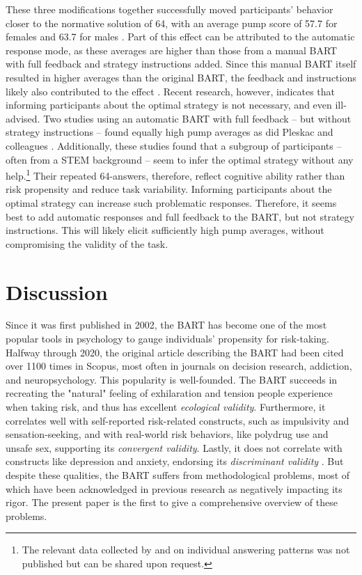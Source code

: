 \documentclass[serif, twocolumn, authordate, meta]{jote-article}
\begin{document}
These three modifications together successfully moved participants' behavior closer to the normative solution of 64, with an average pump score of 57.7 for females and 63.7 for males \parencite{Pleskac2008}. Part of this effect can be attributed to the automatic response mode, as these averages are higher than those from a manual BART with full feedback and strategy instructions added. Since this manual BART itself resulted in higher averages than the original BART, the feedback and instructions likely also contributed to the effect \parencite{Lejuez2002}. Recent research, however, indicates that informing participants about the optimal strategy is not necessary, and even ill-advised. Two studies using an automatic BART with full feedback -- but without strategy instructions -- found equally high pump averages as did Pleskac and colleagues \parencite{Bernoster2019,deGroot2019}. Additionally, these studies found that a subgroup of participants -- often from a STEM background -- seem to infer the optimal strategy without any help.\footnote[2]{The relevant data collected by \cite{Bernoster2019} and \cite{deGroot2019} on individual answering patterns was not published but can be shared upon request.} Their repeated 64-answers, therefore, reflect cognitive ability rather than risk propensity and reduce task variability. Informing participants about the optimal strategy can increase such problematic responses. Therefore, it seems best to add automatic responses and full feedback to the BART, but not strategy instructions. This will likely elicit sufficiently high pump averages, without compromising the validity of the task.

{}
\section*{Discussion}
\label{sec:discussion}

Since it was first published in 2002, the BART has become one of the most popular tools in psychology to gauge individuals' propensity for risk-taking. Halfway through 2020, the original article describing the BART \parencite{Lejuez2002} had been cited over 1100 times in Scopus, most often in journals on decision research, addiction, and neuropsychology. This popularity is well-founded. The BART succeeds in recreating the "natural" feeling of exhilaration and tension people experience when taking risk, and thus has excellent \emph{ecological validity}. Furthermore, it correlates well with self-reported risk-related constructs, such as impulsivity and sensation-seeking, and with real-world risk behaviors, like polydrug use and unsafe sex, supporting its \emph{convergent validity}. Lastly, it does not correlate with constructs like depression and anxiety, endorsing its \emph{discriminant validity} \parencite{Lejuez2002}. But despite these qualities, the BART suffers from methodological problems, most of which have been acknowledged in previous research as negatively impacting its rigor. The present paper is the first to give a comprehensive overview of these problems.
\end{document}
